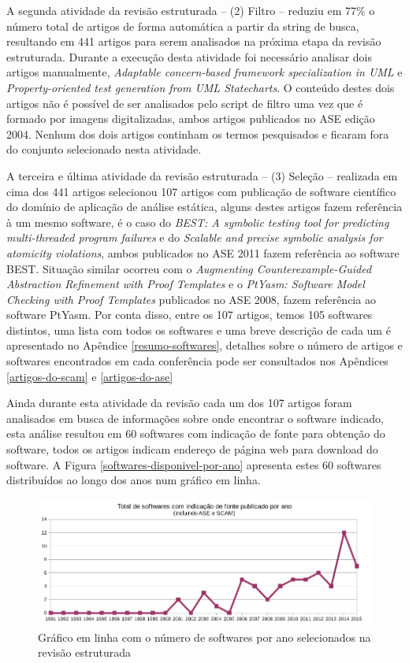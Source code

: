 A segunda atividade da revisão estruturada -- (2) Filtro -- reduziu em 77\%
o número total de artigos de forma automática a partir da string de busca, resultando em 441 artigos
para serem analisados na próxima etapa da revisão estruturada.  Durante a execução desta
atividade foi necessário analisar dois artigos manualmente, {\it Adaptable
concern-based framework specialization in UML} e {\it Property-oriented test
generation from UML Statecharts}. O conteúdo destes dois artigos não é possível
de ser analisados pelo script de filtro uma vez que é formado por imagens
digitalizadas, ambos artigos publicados no ASE edição 2004. Nenhum dos dois
artigos continham os termos pesquisados e ficaram fora do conjunto selecionado
nesta atividade.

A terceira e última atividade da revisão estruturada -- (3) Seleção --
realizada em cima dos 441 artigos selecionou 107 artigos com publicação de
software científico do domínio de aplicação de análise estática, alguns destes
artigos fazem referência à um mesmo software, é o caso do {\it BEST: A symbolic
testing tool for predicting multi-threaded program failures} e do {\it Scalable
and precise symbolic analysis for atomicity violations}, ambos publicados no
ASE 2011 fazem referência ao software BEST. Situação similar ocorreu com o {\it Augmenting
Counterexample-Guided Abstraction Refinement with Proof Templates} e o {\it
PtYasm: Software Model Checking with Proof Templates} publicados no ASE 2008,
fazem referência ao software PtYasm. Por conta disso, entre os 107 artigos, temos
105 softwares distintos, uma lista com todos os softwares e uma breve descrição
de cada um é apresentado no Apêndice \ref{resumo-softwares},
detalhes sobre o número de artigos e softwares encontrados em cada conferência
pode ser consultados nos Apêndices \ref{artigos-do-scam} e \ref{artigos-do-ase} 

Ainda durante esta atividade da revisão cada um dos 107 artigos foram
analisados em busca de informações sobre onde encontrar o software indicado,
esta análise resultou em 60 softwares com indicação de fonte para obtenção do
software, todos os artigos indicam endereço de página web para download do
software. A Figura \ref{softwares-disponivel-por-ano} apresenta estes 60
softwares distribuídos ao longo dos anos num gráfico em linha.

\begin{figure}[h]
  \center
  \includegraphics[scale=0.65]{imagens/softwares-por-ano.png}
  \caption{Gráfico em linha com o número de softwares por ano selecionados na revisão estruturada}
  \label{softwares-por-ano}
\end{figure}

